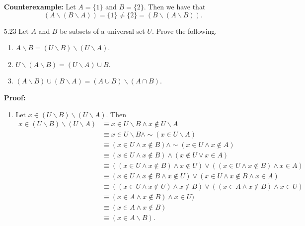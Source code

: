 \begin{enumerate}
      \textbf{Counterexample:} Let $A = \{1\}$ and $B = \{2\}$.
      Then we have that
      $$(A{\backslash}(B{\backslash}A)) = \{1\} \neq \{2\} =
        (B{\backslash}(A{\backslash}B)).$$
   \item[5.23] Let $A$ and $B$ be subsets of a universal set $U$. Prove the
               following.
               \begin{enumerate}
                  \item $A{\backslash}B =
                        (U{\backslash}B){\backslash}(U{\backslash}A)$.
                  \item $U{\backslash}(A{\backslash}B) =
                        (U{\backslash}A) \cup B$.
                  \item $(A{\backslash}B) \cup (B{\backslash}A) =
                        (A \cup B){\backslash}(A \cap B)$.
               \end{enumerate}
               
      \textbf{Proof:}
    
      \begin{enumerate}
         \item Let $x \in (U{\backslash}B){\backslash}(U{\backslash}A)$. Then
               \begin{align*}
                  x \in (U{\backslash}B){\backslash}(U{\backslash}A)
                     &\equiv x \in U{\backslash}B \land
                             x \notin U{\backslash}A \\
                     &\equiv x \in U{\backslash}B \land
                             {\sim}(x \in U{\backslash}A) \\
                     &\equiv (x \in U \land x \notin B) \land
                             {\sim}(x \in U \land x \notin A) \\
                     &\equiv (x \in U \land x \notin B) \land
                             (x \notin U \lor x \in A) \\
                     &\equiv ((x \in U \land x \notin B) \land x \notin U) \lor
                             ((x \in U \land x \notin B) \land x \in A) \\
                     &\equiv (x \in U \land x \notin B \land x \notin U) \lor
                             (x \in U \land x \notin B \land x \in A) \\
                     &\equiv ((x \in U \land x \notin U) \land x \notin B) \lor
                             ((x \in A \land x \notin B) \land x \in U) \\
                     &\equiv (x \in A \land x \notin B) \land x \in U) \\
                     &\equiv (x \in A \land x \notin B) \\
                     &\equiv (x \in A{\backslash}B).
               \end{align*}
               

\end{enumerate}
\end{enumerate}
